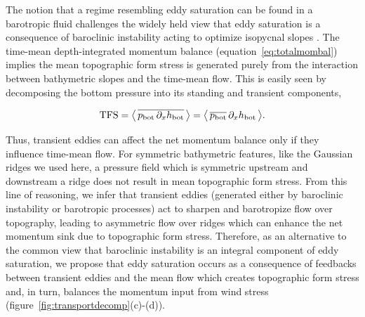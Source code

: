 \documentclass{agujournal2019}
\newcommand{\tfs} {\mathrm{TFS}}
\newcommand{\hb} {h_{\mathrm{bot}}}
\newcommand{\pb} {p_{\mathrm{bot}}}
\begin{document}
The notion that a regime resembling eddy saturation can be found in a barotropic fluid challenges the widely held view that eddy saturation is a consequence of baroclinic instability acting to optimize isopycnal slopes \cite{Straub-1993,Marshall-etal-2017}. The time-mean depth-integrated momentum balance (equation~\eqref{eq:totalmombal}) implies the mean topographic form stress is generated purely from the interaction between bathymetric slopes and the time-mean flow. This is easily seen by decomposing the bottom pressure into its standing and transient components, 
\begin{linenomath*}
\begin{equation}
\vspace*{-0.5em}\tfs = \big\langle\, \overline{\pb\,\partial_x{\hb}}\,\big\rangle = \big\langle\, \overline{\pb}\,\partial_x{\hb}\,\big\rangle.
\end{equation}
\end{linenomath*}
Thus, transient eddies can affect the net momentum balance only if they influence time-mean flow. For symmetric bathymetric features, like the Gaussian ridges we used here, a pressure field which is symmetric upstream and downstream a ridge does not result in mean topographic form stress. From this line of reasoning, we infer that transient eddies (generated either by baroclinic instability or barotropic processes) act to sharpen and barotropize flow over topography, leading to asymmetric flow over ridges \cite{Youngs-etal-2017} which can enhance the net momentum sink due to topographic form stress.  Therefore, as an alternative to the common view that baroclinic instability is an integral component of eddy saturation, we propose that eddy saturation occurs as a consequence of feedbacks between transient eddies and the mean flow which creates topographic form stress and, in turn, balances the momentum input from wind stress (figure~\ref{fig:transportdecomp}\mbox{(c)-(d)}).





\end{document}
